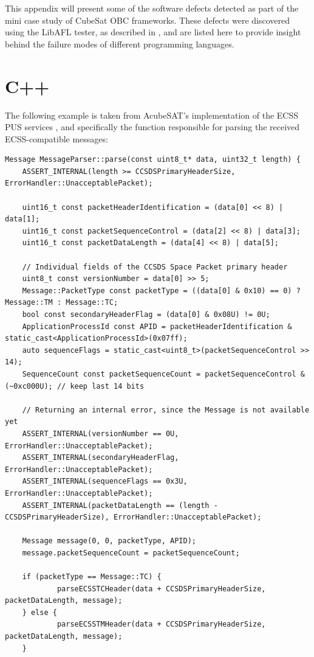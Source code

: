 \documentclass[a4paper,nobib,justified,final]{tufte-book}
\begin{document}
\begin{fullwidth}
This appendix will present some of the software defects detected as part of the mini case study of CubeSat \acs{OBC} frameworks. These defects were discovered using the LibAFL tester, as described in , and are listed here to provide insight behind the failure modes of different programming languages.

\section*{C++}
The following example is taken from AcubeSAT's implementation of the \acs{ECSS} \acs{PUS} services \cite{tsouposOnBoardComputerAcubeSAT2025}, and specifically the function responsible for parsing the received \acs{ECSS}-compatible messages:
\begin{verbatim}
Message MessageParser::parse(const uint8_t* data, uint32_t length) {
	ASSERT_INTERNAL(length >= CCSDSPrimaryHeaderSize, ErrorHandler::UnacceptablePacket);

	uint16_t const packetHeaderIdentification = (data[0] << 8) | data[1];
	uint16_t const packetSequenceControl = (data[2] << 8) | data[3];
	uint16_t const packetDataLength = (data[4] << 8) | data[5];

	// Individual fields of the CCSDS Space Packet primary header
	uint8_t const versionNumber = data[0] >> 5;
	Message::PacketType const packetType = ((data[0] & 0x10) == 0) ? Message::TM : Message::TC;
	bool const secondaryHeaderFlag = (data[0] & 0x08U) != 0U;
	ApplicationProcessId const APID = packetHeaderIdentification & static_cast<ApplicationProcessId>(0x07ff);
	auto sequenceFlags = static_cast<uint8_t>(packetSequenceControl >> 14);
	SequenceCount const packetSequenceCount = packetSequenceControl & (~0xc000U); // keep last 14 bits

	// Returning an internal error, since the Message is not available yet
	ASSERT_INTERNAL(versionNumber == 0U, ErrorHandler::UnacceptablePacket);
	ASSERT_INTERNAL(secondaryHeaderFlag, ErrorHandler::UnacceptablePacket);
	ASSERT_INTERNAL(sequenceFlags == 0x3U, ErrorHandler::UnacceptablePacket);
	ASSERT_INTERNAL(packetDataLength == (length - CCSDSPrimaryHeaderSize), ErrorHandler::UnacceptablePacket);

	Message message(0, 0, packetType, APID);
	message.packetSequenceCount = packetSequenceCount;

	if (packetType == Message::TC) {
			parseECSSTCHeader(data + CCSDSPrimaryHeaderSize, packetDataLength, message);
	} else {
			parseECSSTMHeader(data + CCSDSPrimaryHeaderSize, packetDataLength, message);
	}


\end{verbatim}
\end{fullwidth}
\end{document}
